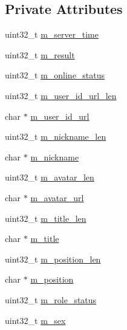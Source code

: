 \subsection*{Private Attributes}
\begin{DoxyCompactItemize}
\item 
uint32\+\_\+t \hyperlink{class_c_im_pdu_login_response_a2b2c6e1596486e4e5c99312c1572a37f}{m\+\_\+server\+\_\+time}
\item 
uint32\+\_\+t \hyperlink{class_c_im_pdu_login_response_a81c24df1c3b5359d7cbc1fa9d40bc70b}{m\+\_\+result}
\item 
uint32\+\_\+t \hyperlink{class_c_im_pdu_login_response_a739a979df7489382e1581c56ffb9a41c}{m\+\_\+online\+\_\+status}
\item 
uint32\+\_\+t \hyperlink{class_c_im_pdu_login_response_a564ac7ee10c6441e0f38ec1800095ee7}{m\+\_\+user\+\_\+id\+\_\+url\+\_\+len}
\item 
char $\ast$ \hyperlink{class_c_im_pdu_login_response_a0245719d6fbb1b3613124c20cd3381b6}{m\+\_\+user\+\_\+id\+\_\+url}
\item 
uint32\+\_\+t \hyperlink{class_c_im_pdu_login_response_a1925121b10bb3487a6874e463043e5f1}{m\+\_\+nickname\+\_\+len}
\item 
char $\ast$ \hyperlink{class_c_im_pdu_login_response_a3117181c35d518c9006f96f81a75fb50}{m\+\_\+nickname}
\item 
uint32\+\_\+t \hyperlink{class_c_im_pdu_login_response_a72e6011c3de953e5b30ec0e1cee004c6}{m\+\_\+avatar\+\_\+len}
\item 
char $\ast$ \hyperlink{class_c_im_pdu_login_response_a50e088c5356e70138433e970e510146d}{m\+\_\+avatar\+\_\+url}
\item 
uint32\+\_\+t \hyperlink{class_c_im_pdu_login_response_aeac6b90e660e0122bb0cc7daaa3e9ed9}{m\+\_\+title\+\_\+len}
\item 
char $\ast$ \hyperlink{class_c_im_pdu_login_response_ac28a8b5e537b790bb7fc3a56e002e48e}{m\+\_\+title}
\item 
uint32\+\_\+t \hyperlink{class_c_im_pdu_login_response_a5ad50427c5921902d688b272a259a719}{m\+\_\+position\+\_\+len}
\item 
char $\ast$ \hyperlink{class_c_im_pdu_login_response_ad09aad1a3797c018a225906147cde7da}{m\+\_\+position}
\item 
uint32\+\_\+t \hyperlink{class_c_im_pdu_login_response_a425766f14f9dc626db4878522c375e4d}{m\+\_\+role\+\_\+status}
\item 
uint32\+\_\+t \hyperlink{class_c_im_pdu_login_response_aed85a80f78fb0acbea1ed3b5edb4fe7b}{m\+\_\+sex}

\end{DoxyCompactItemize}
